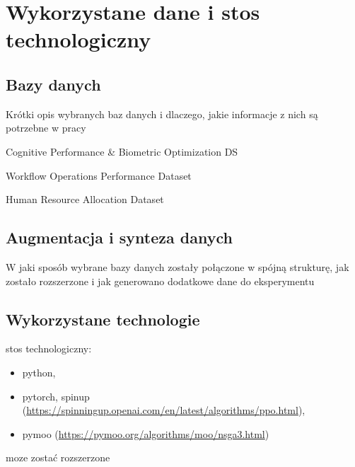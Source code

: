\section{Wykorzystane dane i stos technologiczny}\label{section_data_technology}
\subsection{Bazy danych}\label{section_data_technology_db}
Krótki opis wybranych baz danych i dlaczego, jakie informacje z nich są potrzebne w pracy

Cognitive Performance \& Biometric Optimization DS \cite{cognitive-db}

Workflow Operations Performance Dataset \cite{workflow-db}

Human Resource Allocation Dataset \cite{hr-db}

\subsection{Augmentacja i synteza danych}\label{section_data_technology_augment}
W jaki sposób wybrane bazy danych zostały połączone w spójną strukturę, jak zostało rozszerzone i jak generowano dodatkowe dane do eksperymentu

\subsection{Wykorzystane technologie}\label{section_data_technology_tech}
stos technologiczny: 
\begin{itemize} 
\item python, 
\item pytorch, spinup (\url{https://spinningup.openai.com/en/latest/algorithms/ppo.html}), 
\item pymoo (\url{https://pymoo.org/algorithms/moo/nsga3.html})
\end{itemize}
moze zostać rozszerzone
